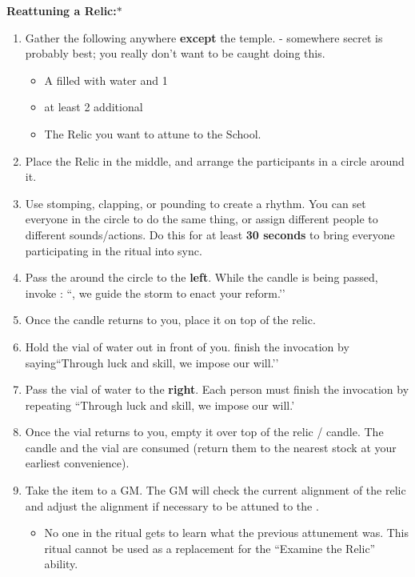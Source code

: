 \documentclass[green]{GL2020}
\begin{document}
\textbf{Reattuning a Relic:}$*$
  \begin{enumerate}
    \item Gather the following anywhere \textbf{except} the temple. - somewhere secret is probably best; you really don’t want to be caught doing this.
    \begin{itemize}
      \item A \iGlassVial{} filled with water and 1 \iRitualCandle{}
      \item at least 2 additional \pGoaties{}
      \item The Relic you want to attune to the School.
    \end{itemize}
    \item Place the Relic in the middle, and arrange the participants in a circle around it. 
		\item Use stomping, clapping, or pounding to create a rhythm. You can set everyone in the circle to do the same thing, or assign different people to different sounds/actions. Do this for at least \textbf{30 seconds} to bring everyone participating in the ritual into sync.
		\item Pass the \iRitualCandle{} around the circle to the \textbf{left}. While the candle is being passed, invoke \cGenesis{}: ``\cGenesis{}, we guide the storm to enact your reform.’’
		\item Once the candle returns to you, place it on top of the relic.
		\item Hold the vial of water out in front of you. finish the invocation by saying``Through luck and skill, we impose our will.’’
		\item Pass the vial of water to the \textbf{right}. Each person must finish the invocation by repeating ``Through luck and skill, we impose our will.’
		\item Once the vial returns to you, empty it over top of the relic / candle. The candle and the vial are consumed (return them to the nearest stock at your earliest convenience).
		\item Take the item to a GM. The GM will check the current alignment of the relic and adjust the alignment if necessary to be attuned to the \pSc{}.
    \begin{itemize}
      \item No one in the ritual gets to learn what the previous attunement was. This ritual cannot be used as a replacement for the ``Examine the Relic'' ability.			
    \end{itemize}
  \end{enumerate}
\end{document}
